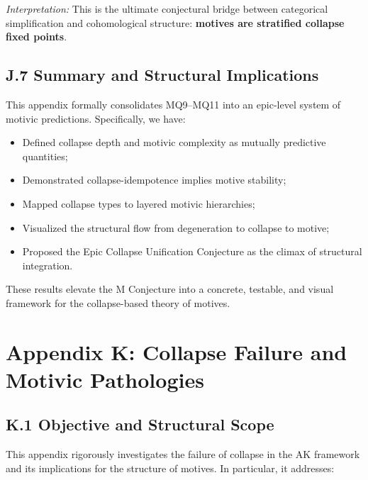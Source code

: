 \documentclass[11pt]{article}
\begin{document}
\textit{Interpretation:} This is the ultimate conjectural bridge between categorical simplification and cohomological structure: \textbf{motives are stratified collapse fixed points}.

\subsection*{J.7 Summary and Structural Implications}

This appendix formally consolidates MQ9–MQ11 into an epic-level system of motivic predictions. Specifically, we have:

\begin{itemize}
    \item Defined collapse depth and motivic complexity as mutually predictive quantities;
    \item Demonstrated collapse-idempotence implies motive stability;
    \item Mapped collapse types to layered motivic hierarchies;
    \item Visualized the structural flow from degeneration to collapse to motive;
    \item Proposed the Epic Collapse Unification Conjecture as the climax of structural integration.
\end{itemize}

These results elevate the M Conjecture into a concrete, testable, and visual framework for the collapse-based theory of motives.

\FloatBarrier




\section*{Appendix K: Collapse Failure and Motivic Pathologies}

\subsection*{K.1 Objective and Structural Scope}

This appendix rigorously investigates the failure of collapse in the AK framework and its implications for the structure of motives. In particular, it addresses:
\end{document}
